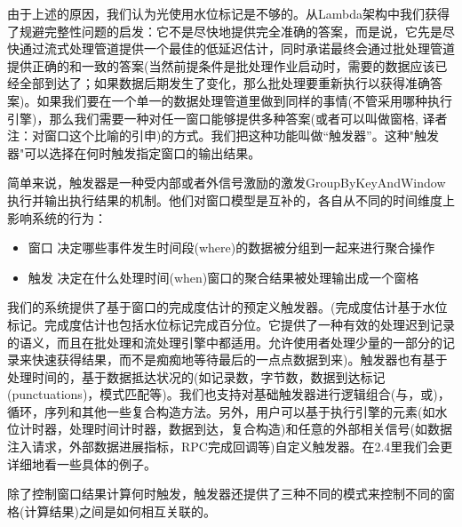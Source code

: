 \documentclass[oneside]{ctexbook}
\begin{document}
由于上述的原因，我们认为光使用水位标记是不够的。从Lambda架构中我们获得了规避完整性问题的启发：它不是尽快地提供完全准确的答案，而是说，它先是尽快通过流式处理管道提供一个最佳的低延迟估计，同时承诺最终会通过批处理管道提供正确的和一致的答案(当然前提条件是批处理作业启动时，需要的数据应该已经全部到达了；如果数据后期发生了变化，那么批处理要重新执行以获得准确答案)。如果我们要在一个单一的数据处理管道里做到同样的事情(不管采用哪种执行引擎)，那么我们需要一种对任一窗口能够提供多种答案(或者可以叫做窗格, 译者注：对窗口这个比喻的引申)的方式。我们把这种功能叫做“触发器”。这种"触发器"可以选择在何时触发指定窗口的输出结果。

简单来说，触发器是一种受内部或者外信号激励的激发GroupByKeyAndWindow执行并输出执行结果的机制。他们对窗口模型是互补的，各自从不同的时间维度上影响系统的行为：

\begin{itemize}
\item 窗口 决定哪些事件发生时间段(where)的数据被分组到一起来进行聚合操作
\item 触发 决定在什么处理时间(when)窗口的聚合结果被处理输出成一个窗格
\end{itemize}
我们的系统提供了基于窗口的完成度估计的预定义触发器。(完成度估计基于水位标记。完成度估计也包括水位标记完成百分位。它提供了一种有效的处理迟到记录的语义，而且在批处理和流处理引擎中都适用。允许使用者处理少量的一部分的记录来快速获得结果，而不是痴痴地等待最后的一点点数据到来)。触发器也有基于处理时间的，基于数据抵达状况的(如记录数，字节数，数据到达标记(punctuations)，模式匹配等)。我们也支持对基础触发器进行逻辑组合(与，或)，循环，序列和其他一些复合构造方法。另外，用户可以基于执行引擎的元素(如水位计时器，处理时间计时器，数据到达，复合构造)和任意的外部相关信号(如数据注入请求，外部数据进展指标，RPC完成回调等)自定义触发器。在2.4里我们会更详细地看一些具体的例子。

除了控制窗口结果计算何时触发，触发器还提供了三种不同的模式来控制不同的窗格(计算结果)之间是如何相互关联的。
\end{document}
